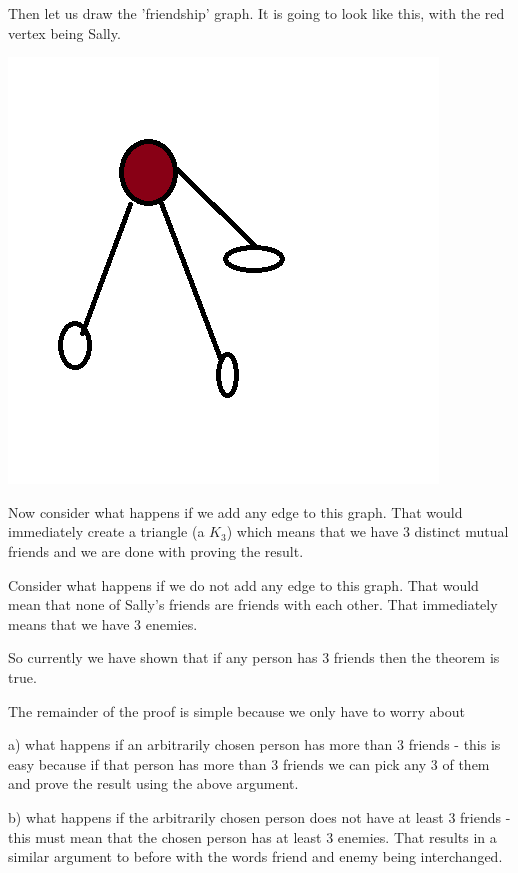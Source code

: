 \documentclass[12pt]{article}
\begin{document}
Then let us draw the 'friendship' graph. It is going to look like this, with the red vertex being Sally.

\includegraphics[scale=0.5]{friends.png}

Now consider what happens if we add any edge to this graph. That would immediately create a triangle (a $K_3$) which means that we have 3 distinct mutual friends and we are done with proving the result.

Consider what happens if we do not add any edge to this graph. That would mean that none of Sally's friends are friends with each other. That immediately means that we have 3 enemies. 

So currently we have shown that if any person has 3 friends then the theorem is true. 

The remainder of the proof is simple because we only have to worry about  

a) what happens if an arbitrarily chosen person has more than 3 friends - this is easy because if that person has more than 3 friends we can pick any 3 of them and prove the result using the above argument.

b) what happens if the arbitrarily chosen person does not have at least 3 friends - this must mean that the chosen person has at least 3 enemies. That results in a similar argument to before with the words friend and enemy being interchanged.
\end{document}
